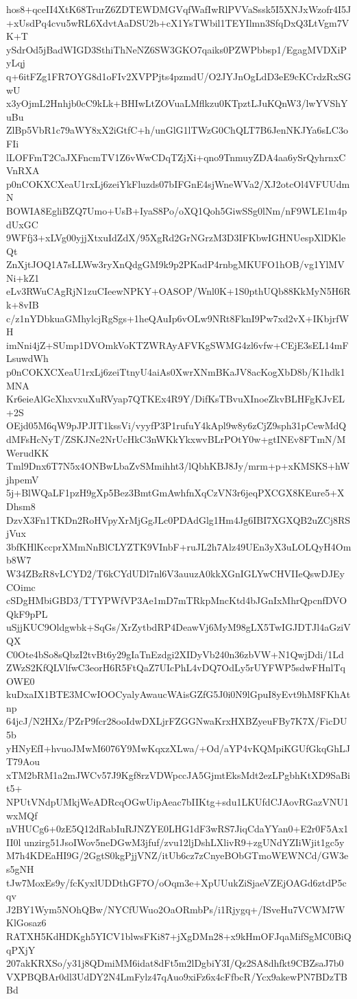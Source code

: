 hos8+qceII4XtK68TrurZ6ZDTEWDMGVqfWafIwRlPVVaSssk5I5XNJxWzofr4I5J
+xUsdPq4cvu5wRL6XdvtAaDSU2b+cX1YsTWbil1TEYIlmn3SfqDxQ3LtVgm7VK+T
ySdrOd5jBadWIGD3SthiThNeNZ6SW3GKO7qaiks0PZWPbbsp1/EgagMVDXiPyLqj
q+6itFZg1FR7OYG8d1oFIv2XVPPjts4pzmdU/O2JYJnOgLdD3eE9cKCrdzRxSGwU
x3yOjmL2Hnhjb0cC9kLk+BHIwLtZOVuaLMflkzu0KTpztLJuKQnW3/lwYVShYuBu
ZlBp5VbR1c79aWY8xX2iGtfC+h/unGlG1lTWzG0ChQLT7B6JenNKJYa6sLC3oFIi
lLOFFmT2CaJXFncmTV1Z6vWwCDqTZjXi+qno9TnmuyZDA4aa6ySrQyhrnxCVnRXA
p0nCOKXCXeaU1rxLj6zeiYkFluzds07bIFGnE4sjWneWVa2/XJ2otcOl4VFUUdmN
BOWIA8EgliBZQ7Umo+UsB+IyaS8Po/oXQ1Qoh5GiwSSg0lNm/nF9WLE1m4pdUxGC
9WFfj3+xLVg00yjjXtxuIdZdX/95XgRd2GrNGrzM3D3IFKbwIGHNUespXlDKleQt
ZnXjtJOQ1A7sLLWw3ryXnQdgGM9k9p2PKadP4rnbgMKUFO1hOB/vg1YlMVNi+kZ1
eLv3RWuCAgRjN1zuCIeewNPKY+OASOP/Wnl0K+1S0pthUQb88KkMyN5H6Rk+8vIB
c/z1nYDbkuaGMhylcjRgSgs+1heQAuIp6vOLw9NRt8FknI9Pw7xd2vX+IKbjrfWH
imNni4jZ+SUmp1DVOmkVoKTZWRAyAFVKgSWMG4zl6vfw+CEjE3sEL14mFLsuwdWh
p0nCOKXCXeaU1rxLj6zeiTtnyU4aiAs0XwrXNmBKaJV8acKogXbD8b/K1hdk1MNA
Kr6eieAlGcXhxvxuXuRVyap7QTKEx4R9Y/DifKsTBvuXInoeZkvBLHFgKJvEL+2S
OEjd05M6qW9pJPJIT1kssVi/vyyfP3P1rufuY4kApl9w8y6zCjZ9sph31pCewMdQ
dMFsHcNyT/ZSKJNe2NrUcHkC3nWKkYkxwvBLrPOtY0w+gtINEv8FTmN/MWerudKK
Tml9Dnx6T7N5x4ONBwLbaZvSMmihht3/lQbhKBJ8Jy/mrm+p+xKMSKS+hWjhpemV
5j+BlWQaLF1pzH9gXp5Bez3BmtGmAwhfnXqCzVN3r6jeqPXCGX8KEure5+XDhsm8
DzvX3Fn1TKDn2RoHVpyXrMjGgJLc0PDAdGlg1Hm4Jg6IBI7XGXQB2uZCj8RSjVux
3bfKHlKccprXMmNnBlCLYZTK9VInbF+ruJL2h7Alz49UEn3yX3uLOLQyH4Omb8W7
W34ZBzR8vLCYD2/T6kCYdUDl7nl6V3auuzA0kkXGnIGLYwCHVIIeQswDJEyCOimc
cSDgHMbiGBD3/TTYPWfVP3Ae1mD7mTRkpMncKtd4bJGnIxMhrQpcnfDVOQkF9pPL
uSjjKUC9Oldgwbk+SqGs/XrZytbdRP4DeawVj6MyM98gLX5TwIGJDTJl4aGziVQX
C0Ote4bSo8sQbzI2tvBt6y29gIaTnEzdgi2XIDyVb240n36zbVW+N1QwjDdi/1Ld
ZWzS2KfQLVlfwC3eorH6R5FtQaZ7UIcPhL4vDQ7OdLy5rUYFWP5sdwFHnlTqOWE0
kuDxaIX1BTE3MCwIOOCyalyAwaucWAisGZfG5J0i0N9lGpuI8yEvt9hM8FKhAtnp
64jcJ/N2HXz/PZrP9fcr28ooIdwDXLjrFZGGNwaKrxHXBZyeuFBy7K7X/FicDU5b
yHNyEfI+hvuoJMwM6076Y9MwKqxzXLwa/+Od/aYP4vKQMpiKGUfGkqGhLJT79Aou
xTM2bRM1a2mJWCv57J9Kgf8rzVDWpccJA5GjmtEksMdt2ezLPgbhKtXD9SaBit5+
NPUtVNdpUMkjWeADRcqOGwUipAeac7bIIKtg+sdu1LKUfdCJAovRGazVNU1wxMQf
nVHUCg6+0zE5Q12dRabIuRJNZYE0LHG1dF3wRS7JiqCdaYYan0+E2r0F5Ax1II0l
unzirg51JsoIWov5neDGwM3jfuf/zvu12ljDshLXlivR9+zgUNdYZIiWjit1gc5y
M7h4KDEaHI9G/2GgtS0kgPjjVNZ/itUb6cz7zCnyeBObGTmoWEWNCd/GW3es5gNH
tJw7MoxEs9y/fcKyxlUDDthGF7O/oOqm3e+XpUUukZiSjaeVZEjOAGd6ztdP5cqv
J2BY1Wym5NOhQBw/NYCfUWuo2OaORmbPs/i1Rjygq+/ISveHu7VCWM7WKlGosaz6
RATXH5KdHDKgh5YICV1blwsFKi87+jXgDMn28+x9kHmOFJqaMifSgMC0BiQqPXjY
207akKRXSo/y31j8QDmiMM6idat8dFt5m2lDgbiY3I/Qz2SA8dhfkt9CBZsaJ7b0
VXPBQBAr0dl3UdDY2N4LmFylz47qAuo9xiFz6x4cFfbcR/Ycx9akewPN7BDzTBBd
